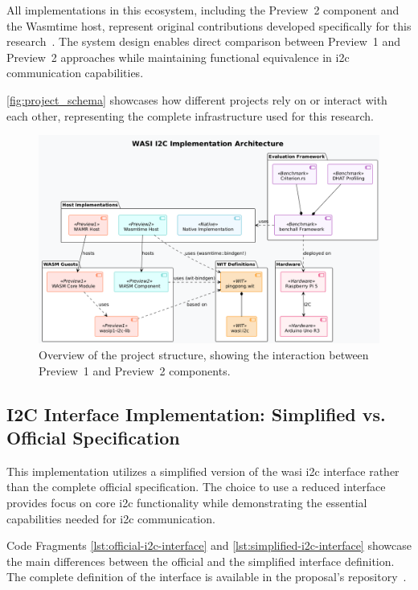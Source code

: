 All implementations in this ecosystem, including the Preview~2 component and the Wasmtime host, represent original contributions developed specifically for this research~\cite{wamr-wasi-i2c}. The system design enables direct comparison between Preview~1 and Preview~2 approaches while maintaining functional equivalence in \acrshort{i2c} communication capabilities.

\autoref{fig:project_schema} showcases how different projects rely on or interact with each other, representing the complete infrastructure used for this research.
\begin{figure}[H]
    \centering
    \includegraphics[width=\textwidth]{images/project_schema.png}
    \caption{Overview of the project structure, showing the interaction between Preview~1 and Preview~2 components.}
    \label{fig:project_schema}
\end{figure}

\subsection{I2C Interface Implementation: Simplified vs. Official Specification}

This implementation utilizes a simplified version of the \acrshort{wasi} \acrshort{i2c} interface rather than the complete official specification. The choice to use a reduced interface provides focus on core \acrshort{i2c} functionality while demonstrating the essential capabilities needed for \acrshort{i2c} communication.

Code Fragments \ref{lst:official-i2c-interface} and \ref{lst:simplified-i2c-interface} showcase the main differences between the official and the simplified interface definition. The complete definition of the interface is available in the proposal's repository~\cite{wasi_i2c_proposal}.

